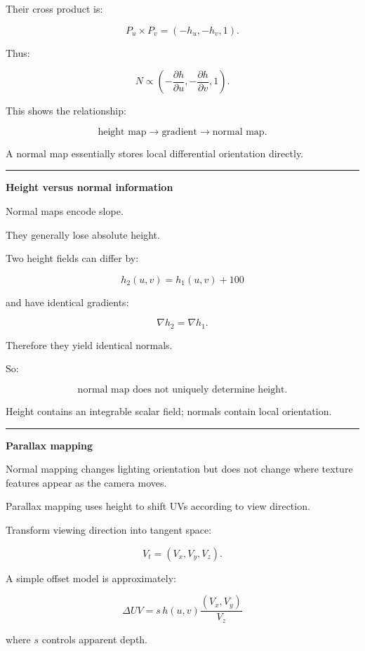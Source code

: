 Their cross product is:

\[
P_u\times P_v
=
(-h_u,-h_v,1).
\]

Thus:

\[
\boxed{
N
\propto
\left(
-\frac{\partial h}{\partial u},
-\frac{\partial h}{\partial v},
1
\right).
}
\]

This shows the relationship:

\[
\boxed{
\text{height map}
\rightarrow
\text{gradient}
\rightarrow
\text{normal map}.
}
\]

A normal map essentially stores local differential orientation directly.

\begin{center}\rule{0.5\linewidth}{0.5pt}\end{center}

\textbf{Height versus normal information}

Normal maps encode slope.

They generally lose absolute height.

Two height fields can differ by:

\[
h_2(u,v)=h_1(u,v)+100
\]

and have identical gradients:

\[
\nabla h_2=\nabla h_1.
\]

Therefore they yield identical normals.

So:

\[
\boxed{
\text{normal map does not uniquely determine height}.
}
\]

Height contains an integrable scalar field; normals contain local orientation.

\begin{center}\rule{0.5\linewidth}{0.5pt}\end{center}

\textbf{Parallax mapping}

Normal mapping changes lighting orientation but does not change where texture features appear as the camera moves.

Parallax mapping uses height to shift UVs according to view direction.

Transform viewing direction into tangent space:

\[
V_t=(V_x,V_y,V_z).
\]

A simple offset model is approximately:

\[
\boxed{
\Delta UV
=
s\,h(u,v)
\frac{(V_x,V_y)}{V_z}
}
\]

where \(s\) controls apparent depth.

